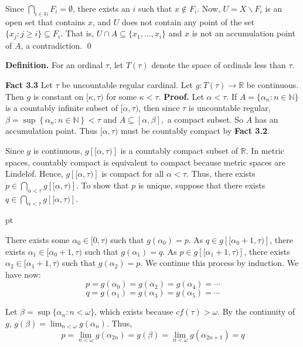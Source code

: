 \documentclass{article}
\begin{document}
			  \vskip 10pt
			  Since $\bigcap_{i\in \mathbb{N}} F_i =\emptyset$, there exists an $i$ such that $x\notin F_i$. Now, $U=X\backslash F_i$ is an open set that contains $x$, and $U$ does not contain any point of the set $\{x_j: j\geq i\}\subseteq F_i$.  That is, $U\cap A \subseteq \{x_1,\dots, x_i\}$ and $x$ is not an accumulation point of $A$, a contradiction.   \qed






			  \vskip 40pt

			  \textbf{Definition. } For an ordinal $\tau$, let $T(\tau)$ denote the space of ordinals less than $\tau$. 

			  \vskip 25pt


			  \textbf{Fact 3.3} Let $\tau$ be uncountable regular cardinal. Let $g: T(\tau)\rightarrow \mathbb{R}$ be continuous.
			  Then  $g$ is constant on $[\kappa, \tau)$ for some $\kappa<\tau$.
			  \vskip 15pt
			  \textbf{Proof.}
			  Let $\alpha<\tau$. If $A=\{\alpha_n: n\in \mathbb{N}\}$ is a countably infinite subset of $[\alpha,\tau)$, then since $\tau$ is uncountable regular, $\beta=\sup \left\{\alpha_n: n\in \mathbb{N}\right\}<\tau$ and $A\subseteq [\alpha, \beta],$ a compact subset.
			  So $A$ has an accumulation point. Thus $[\alpha,\tau)$ must be countably compact by \textbf{Fact 3.2}.

			  \vskip 15pt

			  Since $g$ is continuous, $g\left[[\alpha, \tau)\right]$ is a countably compact subset of $\mathbb{R}$. In metric spaces, countably compact is equivalent to compact because metric spaces are Lindel$\ddot{o}$f. Hence, $g\left[[\alpha,\tau)\right]$ is compact for all $\alpha<\tau$. 
			  Thus, there exists $p \in \bigcap_{\alpha<\tau} g\left[[\alpha, \tau)\right]$. To show that $p$ is unique, suppose that there exists $q \in \bigcap_{\alpha<\tau} g\left[[\alpha, \tau)\right]$. 

			   pt

			  There exists some $\alpha_0 \in [0,\tau)$ such that $g(\alpha_0)=p$. As $q\in g\left[[\alpha_0+1,\tau)\right]$, there exists $\alpha_1\in [\alpha_0+1,\tau)$ such that $g(\alpha_1)=q.$ As $p\in g\left[[\alpha_1+1,\tau)\right]$, there exists $\alpha_2\in [\alpha_1+1,\tau)$ such that $g(\alpha_2)=p.$ We continue this process by induction. We have now: 
			  $$p=g(\alpha_0)=g(\alpha_2)=g(\alpha_4)=\cdots$$
			  $$q=g(\alpha_1)=g(\alpha_3)=g(\alpha_5)=\cdots$$

			  Let $\beta=\sup\{\alpha_n: n<\omega\}$, which exists because $cf(\tau)>\omega$. By the continuity of $g$, $g(\beta)=\lim_{n<\omega} g(\alpha_n)$. Thus, 
			  $$p=\lim_{n<\omega} g(\alpha_{2n})=g(\beta)=\lim_{n<\omega} g(\alpha_{2n+1})=q$$
\end{document}
